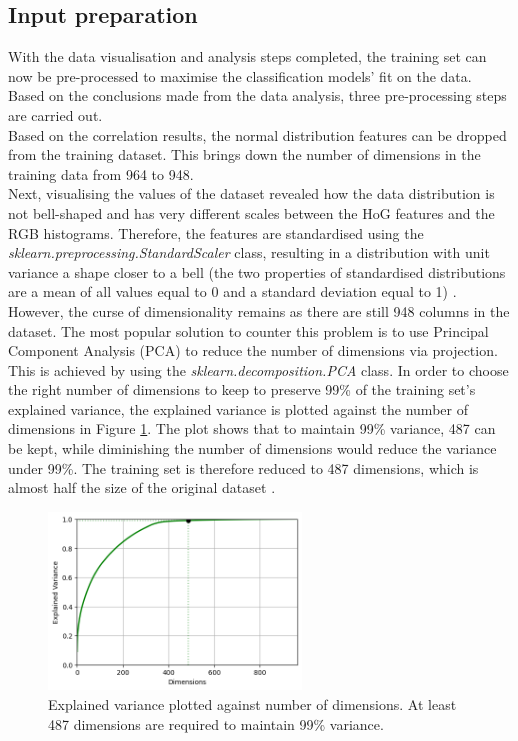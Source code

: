 \documentclass[letterpaper,12pt]{article}
\begin{document}

\subsection{Input preparation}

With the data visualisation and analysis steps completed, the training set can now be pre-processed to maximise the classification models’ fit on the data. Based on the conclusions made from the data analysis, three pre-processing steps are carried out.\\

Based on the correlation results, the normal distribution features can be dropped from the training dataset. This brings down the number of dimensions in the training data from 964 to 948.\\

Next, visualising the values of the dataset revealed how the data distribution is not bell-shaped and has very different scales between the HoG features and the RGB histograms. Therefore, the features are standardised using the \textit{sklearn.preprocessing.StandardScaler} class, resulting in a distribution with unit variance a shape closer to a bell (the two properties of standardised distributions are a mean of all values equal to 0 and a standard deviation equal to 1) \cite{Geron2019}\cite{Glen2014}.\\

However, the curse of dimensionality remains as there are still 948 columns in the dataset. The most popular solution to counter this problem is to use Principal Component Analysis (PCA) to reduce the number of dimensions via projection. This is achieved by using the \textit{sklearn.decomposition.PCA} class. In order to choose the right number of dimensions to keep to preserve 99\% of the training set's explained variance, the explained variance is plotted against the number of dimensions in Figure \ref{fig:explained_variance}. The plot shows that to maintain 99\% variance, 487 can be kept, while diminishing the number of dimensions would reduce the variance under 99\%. The training set is therefore reduced to 487 dimensions, which is almost half the size of the original dataset \cite{Geron2019}.

\begin{figure}[h]
\centerline{\includegraphics[width=0.6\textwidth]{report/figures/explained_variance.png}}
\caption{\label{fig:explained_variance}Explained variance plotted against number of dimensions. At least 487 dimensions are  required to maintain 99\% variance.}
\end{figure}
\end{document}
